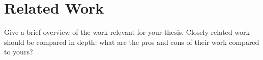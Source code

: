 \chapter{Related Work}\label{chap:relatedwork}
Give a brief overview of the work relevant for your thesis.
Closely related work should be compared in depth: what are the pros and cons of their work compared to yours?
